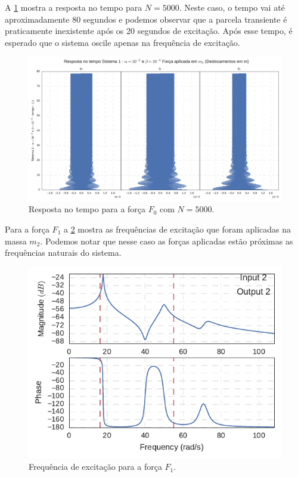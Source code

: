 A \cref{fig:F0_5000_tempo} mostra a resposta no tempo para $N=5000$. Neste caso, o tempo vai até aproximadamente 80 segundos e podemos observar que a parcela transiente é praticamente inexistente após os 20 segundos de excitação. Após esse tempo, é esperado que o sistema oscile apenas na frequência de excitação.

\begin{figure}
	\centering
	\includegraphics[scale=0.6]{IMGS/F0_5000_tempo.pdf}
	\caption{Resposta no tempo para a força $F_0$ com $N=5000$.}
	\label{fig:F0_5000_tempo}
\end{figure}

Para a força $F_1$ a \cref{fig:FRF_i2_o2_freq_1_2} mostra as frequências de excitação que foram aplicadas na massa $m_2$. Podemos notar que nesse caso as forças aplicadas estão próximas as frequências naturais do sistema.

\begin{figure}
	\centering
	\includegraphics[scale=1]{IMGS/FRF_i2_o2_freq_1_2.pdf}
	\caption{Frequência de excitação para a força $F_1$.}
	\label{fig:FRF_i2_o2_freq_1_2}
\end{figure}

